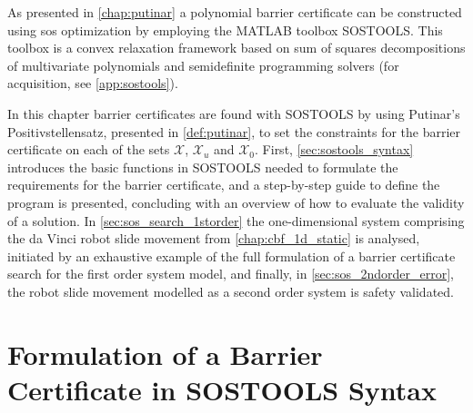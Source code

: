As presented in \autoref{chap:putinar} a polynomial barrier certificate can be constructed using \gls{sos} optimization by employing the MATLAB toolbox SOSTOOLS. This toolbox is a convex relaxation framework based on sum of squares decompositions of multivariate polynomials and semidefinite programming solvers \citep{bib:prajna_framework} (for acquisition, see \autoref{app:sostools}).

In this chapter barrier certificates are found with SOSTOOLS by using Putinar's Positivstellensatz, presented in \autoref{def:putinar}, to set the constraints for the barrier certificate on each of the sets $\mathcal{X}$, $\mathcal{X}_u$ and $\mathcal{X}_0$.
First, \autoref{sec:sostools_syntax} introduces the basic functions in SOSTOOLS needed to formulate the requirements for the barrier certificate, and a step-by-step guide to define the program is presented, concluding with an overview of how to evaluate the validity of a solution.
In \autoref{sec:sos_search_1storder} the one-dimensional system comprising the da Vinci robot slide movement from \autoref{chap:cbf_1d_static} is analysed, initiated by an exhaustive example of the full formulation of a barrier certificate search for the first order system model, %
and finally, in \autoref{sec:sos_2ndorder_error}, the robot slide movement modelled as a second order system  is safety validated.



\section{Formulation of a Barrier Certificate in SOSTOOLS Syntax}\label{sec:sostools_syntax}

